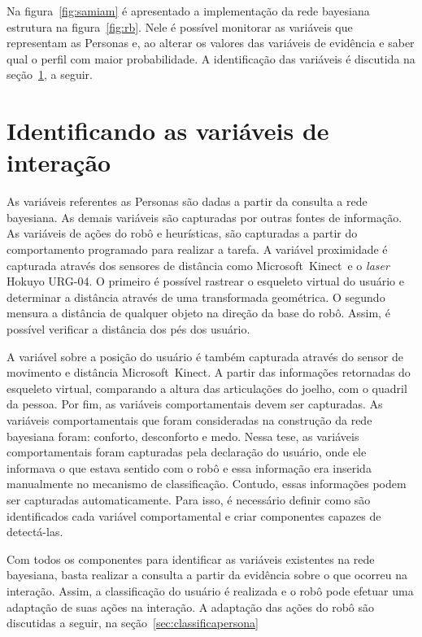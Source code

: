 Na figura~\ref{fig:samiam} é apresentado a implementação da rede bayesiana estrutura na figura~\ref{fig:rb}. Nele é possível monitorar as variáveis que representam as Personas e, ao alterar os valores das variáveis de evidência e saber qual o perfil com maior probabilidade. A identificação das variáveis é discutida na seção~\ref{sec:idvariavel}, a seguir.

\section{Identificando as variáveis de interação}
\label{sec:idvariavel}
As variáveis referentes as Personas são dadas a partir da consulta a rede bayesiana. As demais variáveis são capturadas por outras fontes de informação. As variáveis de ações do robô e heurísticas, são capturadas a partir do comportamento programado para realizar a tarefa. A variável proximidade é capturada através dos sensores de distância como Microsoft\textregistered\ Kinect\textregistered\ e o \emph{laser} Hokuyo URG-04. O primeiro é possível rastrear o esqueleto virtual do usuário e determinar a distância através de uma transformada geométrica. O segundo mensura a distância de qualquer objeto na direção da base do robô. Assim, é possível verificar a distância dos pés dos usuário.

A variável sobre a posição do usuário é também capturada através do sensor de movimento e distância Microsoft\textregistered\ Kinect\textregistered. A partir das informações retornadas do esqueleto virtual, comparando a altura das articulações do joelho, com o quadril da pessoa. Por fim, as variáveis comportamentais devem ser capturadas. As variáveis comportamentais que foram consideradas na construção da rede bayesiana foram: conforto, desconforto e medo. Nessa tese, as variáveis comportamentais foram capturadas pela declaração do usuário, onde ele informava o que estava sentido com o robô e essa informação era inserida manualmente no mecanismo de classificação. Contudo, essas informações podem ser capturadas automaticamente. Para isso, é necessário definir como são identificados cada variável comportamental e criar componentes capazes de detectá-las.

Com todos os componentes para identificar as variáveis existentes na rede bayesiana, basta realizar a consulta a partir da evidência sobre o que ocorreu na interação. Assim, a classificação do usuário é realizada e o robô pode efetuar uma adaptação de suas ações na interação. A adaptação das ações do robô são discutidas a seguir, na seção~\ref{sec:classificapersona}

